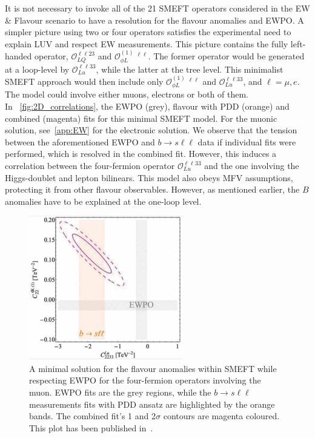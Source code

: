 It is not necessary to invoke all of the 21 SMEFT operators considered in the { EW \& Flavour} scenario to have a resolution for the flavour anomalies and EWPO. A simpler picture using two or four operators satisfies the experimental need to explain LUV and respect EW measurements. This picture contains the fully left-handed operator, $\mathcal{O}_{LQ}^{\ell \ell 2 3}$ and $\mathcal{O}_{\phi L}^{(1)} \ ^{\ell \ell}$. The former operator would be generated at a loop-level by $\mathcal{O}_{Lu}^{\ell \ell 3 3}$, while the latter at the tree level.  This minimalist SMEFT approach would then include only  $\mathcal{O}_{\phi L}^{(1)} \ ^{\ell \ell}$ and $\mathcal{O}_{Lu}^{\ell \ell 3 3}$, and $\ell= \mu, e$.  The model could involve either muons, electrons or both of them.\\ 
In~ \autoref{fig:2D_correlations}, the EWPO (grey), flavour with PDD (orange) and combined (magenta) fits for this minimal SMEFT model. For the muonic solution, see~\autoref{app:EW} for the electronic solution. We observe that the tension between the aforementioned EWPO and $b \to s \ell \ell$ data if individual fits were performed, which is resolved in the combined fit. However, this induces a correlation between the four-fermion operator $\mathcal{O}_{Lu}^{\ell \ell 3 3}$ and the one involving the Higgs-doublet and lepton bilinears. This model also obeys MFV assumptions, protecting it from other flavour observables. However, as mentioned earlier, the $B$ anomalies have to be explained at the one-loop level. 
\begin{figure}[htpb!]
	\centering
	\includegraphics[width=0.6\textwidth]{figures/CHL_CLu_m.pdf}
	\caption{ A minimal solution for the flavour anomalies within SMEFT while respecting EWPO for the four-fermion operators involving the muon. EWPO fits are the grey regions, while the $b \to s\ell \ell$ measurements fits with PDD ansatz are highlighted by the orange bands. The combined fit's 1 and 2$\sigma$ contours are magenta coloured. This plot has been published in~\cite{Alasfar:2020mne}.  } 
	\label{fig:2D_correlations}
\end{figure}
